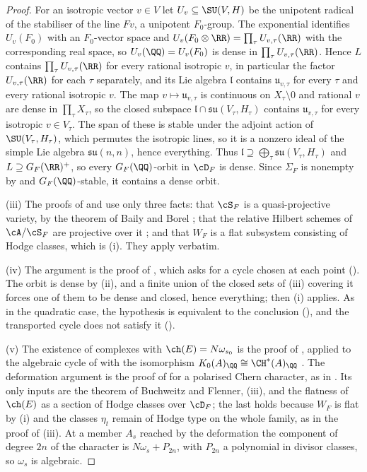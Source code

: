 \begin{proof}
For an isotropic vector $v\in V$ let $U_{v}\subseteq\SU(V,H)$ be the
unipotent radical of the stabiliser of the line $Fv$, a unipotent
$F_{0}$-group. The exponential identifies $U_{v}(F_{0})$ with an
$F_{0}$-vector space and $U_{v}(F_{0}\otimes\RR)=\prod_{\tau}U_{v,\tau}(\RR)$
with the corresponding real space, so $U_{v}(\QQ)=U_{v}(F_{0})$ is dense in
$\prod_{\tau}U_{v,\tau}(\RR)$. Hence $L$ contains
$\prod_{\tau}U_{v,\tau}(\RR)$ for every rational isotropic $v$, in particular
the factor $U_{v,\tau}(\RR)$ for each $\tau$ separately, and its Lie algebra
$\mathfrak{l}$ contains $\mathfrak{u}_{v,\tau}$ for every $\tau$ and every
rational isotropic $v$. The map $v\mapsto\mathfrak{u}_{v,\tau}$ is continuous
on $X_{\tau}\setminus0$ and rational $v$ are dense in
$\prod_{\tau}X_{\tau}$, so the closed subspace
$\mathfrak{l}\cap\mathfrak{su}(V_{\tau},H_{\tau})$ contains
$\mathfrak{u}_{v,\tau}$ for every isotropic $v\in V_{\tau}$. The span of these
is stable under the adjoint action of $\SU(V_{\tau},H_{\tau})$, which permutes
the isotropic lines, so it is a nonzero ideal of the simple Lie algebra
$\mathfrak{su}(n,n)$, hence everything. Thus
$\mathfrak{l}\supseteq\bigoplus_{\tau}\mathfrak{su}(V_{\tau},H_{\tau})$ and
$L\supseteq G_{F}(\RR)^{+}$, so every $G_{F}(\QQ)$-orbit in $\cD_{F}$ is
dense. Since $\Sigma_{F}$ is nonempty by  and
$G_{F}(\QQ)$-stable, it contains a dense orbit.

(iii) The proofs of  and  use
only three facts: that $\cS_{F}$ is a quasi-projective variety, by the
theorem of Baily and Borel \cite{BB66}; that the relative Hilbert schemes of
$\cA/\cS_{F}$ are projective over it \cite{Gro61}; and that $W_{F}$ is a flat
subsystem consisting of Hodge classes, which is (i). They
apply verbatim.

(iv) The argument is the proof of , which asks for a
cycle chosen at each point (). The orbit is dense by
(ii), and a finite union of the closed sets of (iii) covering it forces one of
them to be dense and closed, hence everything; then (i) applies. As in the
quadratic case, the hypothesis is equivalent to the conclusion
(), and the transported cycle does not satisfy it
().

(v) The existence of complexes with $\ch(E)=N\omega_{s_{0}}$ is the proof of
\cite[Proposition~2.1]{paperII}, applied to the algebraic cycle of 
with the isomorphism $K_{0}(A)_{\QQ}\cong\CH^{*}(A)_{\QQ}$ \cite{Ful98}. The
deformation argument is the proof of \cite[Theorem~2.3]{paperII} for a
polarised Chern character, as in \cite[Remark~3.6]{paperII}. Its only inputs are
the theorem of Buchweitz and Flenner, (iii), and the flatness of $\ch(E)$ as
a section of Hodge classes over $\cD_{F}$; the last holds because $W_{F}$ is
flat by (i) and the classes $\eta_{t}$ remain of Hodge type
on the whole family, as in the proof of (iii). At a member
$A_{s}$ reached by the deformation the component of degree $2n$ of the
character is $N\omega_{s}+P_{2n}$, with $P_{2n}$ a polynomial in divisor
classes, so $\omega_{s}$ is algebraic.
\end{proof}

